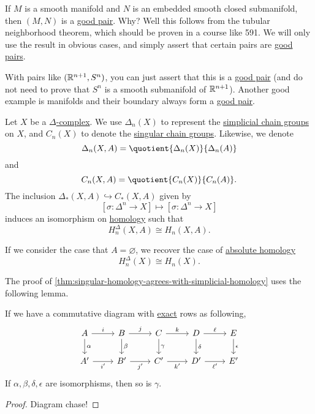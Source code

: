 \begin{remark}
	If $M$ is a smooth manifold and $N$ is an embedded smooth closed submanifold, then $(M, N)$ is a \hyperref[def:good-pair]{good pair}. Why? Well this
	follows from the tubular neighborhood theorem, which should be proven in a course like 591. We will only use the result in obvious cases, and simply
	assert that certain pairs are \hyperref[def:good-pair]{good pairs}.
\end{remark}

With pairs like $(\mathbb{\MakeUppercase{r}}^{n + 1}, S^n)$, you can just assert that this is a \hyperref[def:good-pair]{good pair} (and do not need to
prove that $S^n$ is a smooth submanifold of $\mathbb{\MakeUppercase{r}}^{n + 1}$). Another good example is manifolds and their boundary always form a \hyperref[def:good-pair]{good pair}.

\begin{theorem}\label{thm:singular-homology-agrees-with-simplicial-homology}
	Let $X$ be a \hyperref[def:delta-complex]{$\Delta$-complex}. We use $\Delta_n(X)$ to represent the \hyperref[def:simplicial-complex]{simplicial chain groups} on $X$, and
	$C_n(X)$ to denote the \hyperref[def:singular-chain]{singular chain groups}. Likewise, we denote
	\[
		\Delta_n(X, A) = \quotient{\Delta_n(X)}{\Delta_n(A)}
	\]
	and
	\[
		C_n(X, A) = \quotient{C_n(X)}{C_n(A)}.
	\]
	The inclusion $\Delta_\ast(X, A) \hookrightarrow C_\ast(X, A)$ given by
	\[
		[\sigma : \Delta^n \to X] \mapsto [\sigma : \Delta^n \to X]
	\]
	induces an isomorphism on \hyperref[def:homology-group]{homology} such that
	\[
		H_n^\Delta(X, A) \cong H_n(X, A).
	\]

	If we consider the case that \(A = \varnothing\), we recover the case of \hyperref[def:homology-group]{absolute homology}
	\[
		H_n^\Delta(X) \cong H_n(X).
	\]
\end{theorem}
The proof of \autoref{thm:singular-homology-agrees-with-simplicial-homology} uses the following lemma.
\begin{lemma}\label{lma:the-five-lemma}
	If we have a commutative diagram with \hyperref[def:exact]{exact} rows as following,
	\[
		\begin{tikzcd}
			A & B & C & D & E \\
			{A^\prime} & {B^\prime} & {C^\prime} & {D^\prime} & {E^\prime}
			\arrow["\alpha", from=1-1, to=2-1]
			\arrow["\gamma", from=1-3, to=2-3]
			\arrow["\delta", from=1-4, to=2-4]
			\arrow["\epsilon", from=1-5, to=2-5]
			\arrow["{i^\prime}"', from=2-1, to=2-2]
			\arrow["\beta", from=1-2, to=2-2]
			\arrow["{j^\prime}"', from=2-2, to=2-3]
			\arrow["{k^\prime}"', from=2-3, to=2-4]
			\arrow["{\ell^\prime}"', from=2-4, to=2-5]
			\arrow["\ell", from=1-4, to=1-5]
			\arrow["k", from=1-3, to=1-4]
			\arrow["j", from=1-2, to=1-3]
			\arrow["i", from=1-1, to=1-2]
		\end{tikzcd}
	\]
	If $\alpha, \beta, \delta, \epsilon$ are isomorphisms, then so is $\gamma$.
\end{lemma}
\begin{proof}
	Diagram chase!
\end{proof}